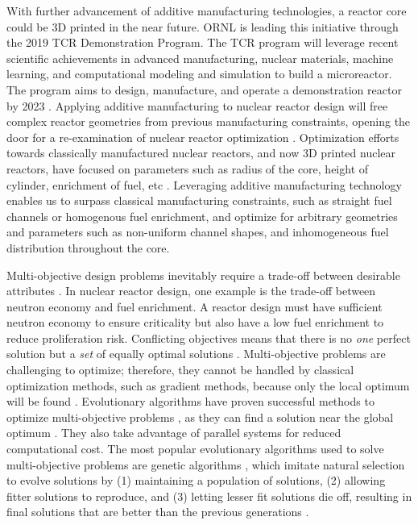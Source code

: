 With further advancement of additive manufacturing technologies, a reactor 
core could be 3D printed in the near future. 
\gls{ORNL} is leading this initiative through the 2019 \gls{TCR} Demonstration 
Program. 
The \gls{TCR} program will leverage recent scientific achievements in advanced 
manufacturing, nuclear materials, machine learning, and computational modeling 
and simulation to build a microreactor. 
The program aims to design, manufacture, and operate a demonstration reactor 
by 2023 \cite{terrani_transformational_2019}. 
Applying additive manufacturing to nuclear reactor design will free complex 
reactor geometries from previous manufacturing constraints,
opening the door for a re-examination of nuclear reactor optimization 
\cite{sobes_artificial_2020}. 
Optimization efforts towards classically manufactured nuclear reactors, and now
3D printed nuclear reactors, have focused on parameters such as radius of the 
core, height of cylinder, enrichment of fuel, etc 
\cite{sobes_artificial_2020,sacco_two_2006,kumar_new_2015,pereira_parallel_2008}. 
Leveraging additive manufacturing technology enables us to surpass classical 
manufacturing constraints, such as straight fuel channels or homogenous fuel 
enrichment, and optimize for arbitrary geometries and parameters 
such as non-uniform channel shapes, and inhomogeneous fuel distribution throughout 
the core. 

Multi-objective design problems inevitably require a trade-off between 
desirable attributes \cite{byrne_evolving_2014,simon_sciences_2019}. 
In nuclear reactor design, one example is the trade-off between neutron economy 
and fuel enrichment.
A reactor design must have sufficient neutron economy to ensure criticality but 
also have a low fuel enrichment to reduce proliferation risk. 
Conflicting objectives means that there is no \textit{one} perfect solution but 
a \textit{set} of equally optimal solutions \cite{byrne_evolving_2014}.
Multi-objective problems are challenging to optimize; therefore, they cannot be 
handled by classical optimization methods, such as gradient methods, because only 
the local optimum will be found \cite{renner_genetic_2003}. 
Evolutionary algorithms have proven successful methods to optimize 
multi-objective problems \cite{krish_practical_2011}, as 
they can find a solution near the global optimum \cite{renner_genetic_2003}.
They also take advantage of parallel systems for reduced computational cost.
The most popular evolutionary algorithms used to solve multi-objective 
problems are genetic algorithms \cite{byrne_evolving_2014, krish_practical_2011},
which imitate natural selection to evolve solutions by (1) maintaining a 
population of solutions, (2) allowing fitter solutions to reproduce, and (3) 
letting lesser fit solutions die off, resulting in final solutions that are 
better than the previous generations \cite{renner_genetic_2003}. 

